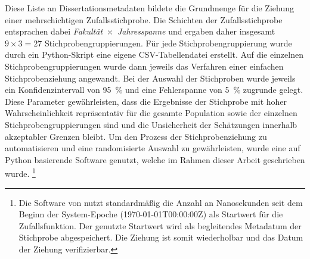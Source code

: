 Diese Liste an Dissertationsmetadaten bildete die Grundmenge für die Ziehung einer mehrschichtigen Zufallsstichprobe.
Die Schichten der Zufallsstichprobe entsprachen dabei \textit{Fakultät}~$\times$~\textit{Jahresspanne} und ergaben daher insgesamt $\num{9}\times\num{3}=\num{27}$ Stichprobengruppierungen.
Für jede Stichprobengruppierung wurde durch ein Python-Skript \autocite{my-dataset} eine eigene CSV-Tabellendatei erstellt.
Auf die einzelnen Stichprobengruppierungen wurde dann jeweils das Verfahren einer einfachen Stichprobenziehung angewandt.
Bei der Auswahl der Stichproben wurde jeweils ein Konfidenzintervall von \SI[round-mode=places,round-precision=2]{95}{\percent} und eine Fehlerspanne von \SI[round-mode=places,round-precision=2]{5}{\percent} zugrunde gelegt.
Diese Parameter gewährleisten, dass die Ergebnisse der Stichprobe mit hoher Wahrscheinlichkeit repräsentativ für die gesamte Population sowie der einzelnen Stichprobengruppierungen sind und die Unsicherheit der Schätzungen innerhalb akzeptabler Grenzen bleibt.
Um den Prozess der Stichprobenziehung zu automatisieren und eine randomisierte Auswahl zu gewährleisten, wurde eine auf Python basierende Software \autocite{Krassnig2024-csv} genutzt, welche im Rahmen dieser Arbeit geschrieben wurde.%
\footnote{%
Die Software von \citeauthor{Krassnig2024-csv} \autocite{Krassnig2024-csv} nutzt standardmäßig die Anzahl an Nanosekunden seit dem Beginn der System-Epoche (1970-01-01T00:00:00Z) als Startwert für die Zufallsfunktion.
Der genutzte Startwert wird als begleitendes Metadatum der Stichprobe abgespeichert.
Die Ziehung ist somit wiederholbar und das Datum der Ziehung verifizierbar.} 

